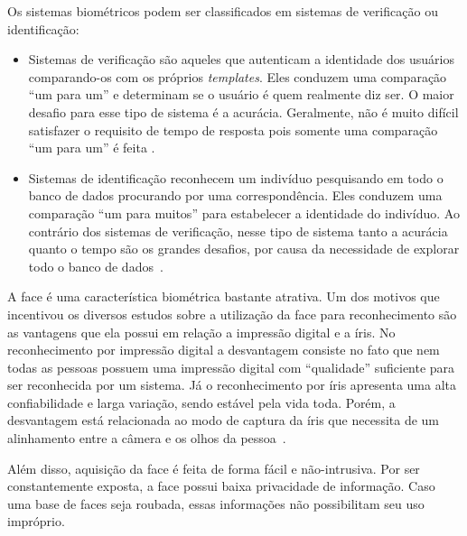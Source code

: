 	Os sistemas biométricos podem ser classificados em sistemas de verificação ou
	identificação:
	
	\begin{itemize}
		\item Sistemas de verificação são aqueles que autenticam a identidade
		dos usuários comparando-os com os próprios \textit{templates}. Eles conduzem
		uma comparação ``um para um'' e determinam se o usuário é quem realmente diz ser. O
		maior desafio para esse tipo de sistema é a acurácia. Geralmente, não é muito
		difícil satisfazer o requisito de tempo de resposta pois somente uma comparação
		``um para um'' é feita \cite{hong}.
	
		\item Sistemas de identificação reconhecem um indivíduo pesquisando em todo o
		banco de dados procurando por uma correspondência. Eles conduzem uma comparação ``um para
		muitos'' para estabelecer a identidade do indivíduo. Ao contrário dos sistemas
		de verificação, nesse tipo de sistema tanto a acurácia quanto o tempo são os
		grandes desafios, por causa da necessidade de explorar todo o banco de dados~\cite{hong}.
	\end{itemize}
	
	A face é uma característica biométrica bastante atrativa. Um dos motivos que
	incentivou os diversos estudos sobre a utilização da face para reconhecimento
	são as vantagens que ela possui em relação a impressão digital e a íris.  No
	reconhecimento por impressão digital a desvantagem consiste no fato que nem
	todas as pessoas possuem uma impressão digital com ``qualidade'' suficiente para
	ser reconhecida por um sistema. Já o reconhecimento por íris apresenta uma alta
	confiabilidade e larga variação, sendo estável pela vida toda. Porém, a
	desvantagem está relacionada ao modo de captura da íris que necessita de um
	alinhamento entre a câmera e os olhos da pessoa~\cite{saocarlos}.
	
	Além disso, aquisição da face é feita de forma fácil e não-intrusiva. Por ser
	constantemente exposta, a face possui baixa privacidade de informação. Caso uma
	base de faces seja roubada, essas informações não possibilitam seu uso
	impróprio.
